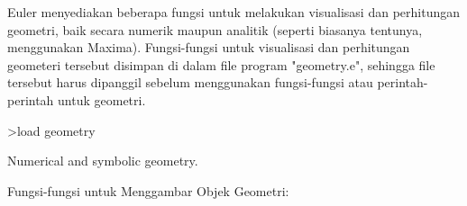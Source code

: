 \documentclass[a4paper,10pt]{article}
\begin{document}
\begin{eulernotebook}
\begin{eulercomment}
\begin{eulercomment}
\begin{eulercomment}
\begin{eulercomment}
\begin{eulercomment}
\begin{eulercomment}
\begin{eulercomment}
\begin{eulercomment}
\begin{eulercomment}
\begin{eulercomment}
\begin{eulercomment}
\begin{eulercomment}
\begin{eulercomment}
\begin{eulercomment}
\begin{eulercomment}
\begin{eulercomment}
\begin{eulercomment}
Euler menyediakan beberapa fungsi untuk melakukan visualisasi dan
perhitungan geometri, baik secara numerik maupun analitik (seperti
biasanya tentunya, menggunakan Maxima). Fungsi-fungsi untuk
visualisasi dan perhitungan geometeri tersebut disimpan di dalam file
program "geometry.e", sehingga file tersebut harus dipanggil sebelum
menggunakan fungsi-fungsi atau perintah-perintah untuk geometri.
\end{eulercomment}
\begin{eulerprompt}
>load geometry
\end{eulerprompt}
\begin{euleroutput}
  Numerical and symbolic geometry.
\end{euleroutput}
\begin{eulercomment}
Fungsi-fungsi untuk Menggambar Objek Geometri:


\end{eulercomment}
\end{eulercomment}
\end{eulercomment}
\end{eulercomment}
\end{eulercomment}
\end{eulercomment}
\end{eulercomment}
\end{eulercomment}
\end{eulercomment}
\end{eulercomment}
\end{eulercomment}
\end{eulercomment}
\end{eulercomment}
\end{eulercomment}
\end{eulercomment}
\end{eulercomment}
\end{eulercomment}
\end{eulernotebook}
\end{document}
